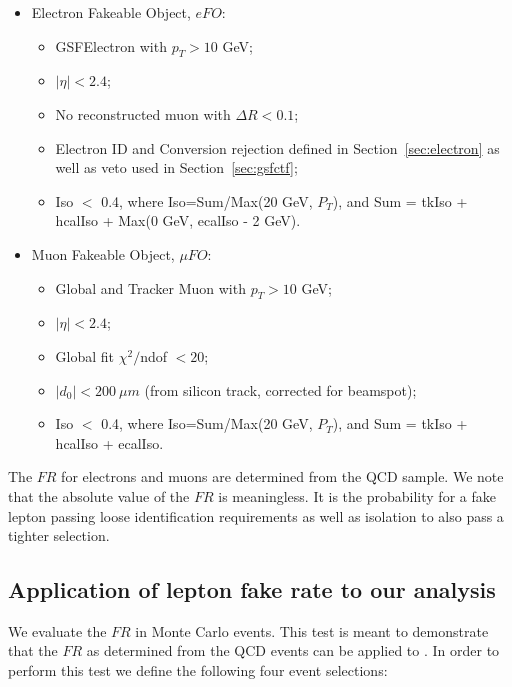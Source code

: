 \begin{itemize}
\item Electron Fakeable Object, $eFO$:
\begin{itemize}
\item GSFElectron with $p_T > 10$ GeV;
\item $|\eta| < 2.4$;
\item No reconstructed muon with $\Delta R < 0.1$;
\item Electron ID and Conversion rejection defined in Section~\ref{sec:electron} as well as veto used in Section~\ref{sec:gsfctf};
\item Iso $<$ 0.4, where Iso=Sum/Max(20 GeV, $P_T$), and Sum = tkIso + hcalIso +  Max(0 GeV, ecalIso - 2 GeV).
\end{itemize} 

\item Muon Fakeable Object, $\mu FO$:
\begin{itemize}
\item Global and Tracker Muon with $p_T > 10$ GeV;
\item $|\eta| < 2.4$;
\item Global fit $\chi^2 /$ndof $ < 20 $;
\item $|d_0| < 200~\mu m$ (from silicon track, corrected for beamspot);
\item Iso $<$ 0.4, where Iso=Sum/Max(20 GeV, $P_T$), and Sum = tkIso + hcalIso +  ecalIso.
\end{itemize} 
\end{itemize} 

The $FR$ for electrons and muons are determined from the QCD sample.
We note that the absolute value of the $FR$ is meaningless. It is the probability for a
fake lepton passing loose identification requirements as well as isolation to also pass a tighter
selection. 

\subsection{Application of lepton fake rate to our analysis}
\label{subsec:fakerateapplication}

We evaluate the $FR$ in \ttbar Monte Carlo events. This test is meant to demonstrate that the 
$FR$ as determined from the QCD events can be applied to \ttbar. In order to perform this test we 
define the following four event selections:

